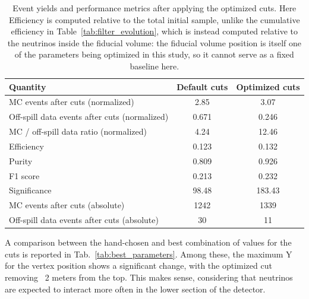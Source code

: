 \begin{table}[htbp]
    \centering
    \begin{tabular}{lcc}
        \hline
        Quantity & Default cuts & Optimized cuts \\
        \hline
        MC events after cuts (normalized)                  & 2.85   & 3.07   \\
        Off-spill data events after cuts (normalized)      & 0.671  & 0.246  \\
        MC / off-spill data ratio (normalized)             & 4.24   & 12.46  \\
        Efficiency                                         & 0.123  & 0.132  \\
        Purity                                             & 0.809  & 0.926  \\
        F1 score                                           & 0.213  & 0.232  \\
        Significance                                       & 98.48  & 183.43 \\
        MC events after cuts (absolute)                    & 1242   & 1339   \\
        Off-spill data events after cuts (absolute)        & 30     & 11     \\
        \hline
    \end{tabular}
    \caption{Event yields and performance metrics after applying the optimized cuts. Here Efficiency is computed relative to the total initial sample, unlike the cumulative efficiency in Table~\ref{tab:filter_evolution}, which is instead computed relative to the neutrinos inside the fiducial volume: the fiducial volume position is itself one of the parameters being optimized in this study, so it cannot serve as a fixed baseline here.}
    \label{tab:results_summary}
\end{table}



A comparison between the hand-chosen and best combination of values for the cuts is reported in Tab.~\ref{tab:best_parameters}. Among these, the maximum Y for the vertex position shows a significant change, with the optimized cut removing ~2 meters from the top. This makes sense, considering that neutrinos are expected to interact more often in the lower section of the detector.

